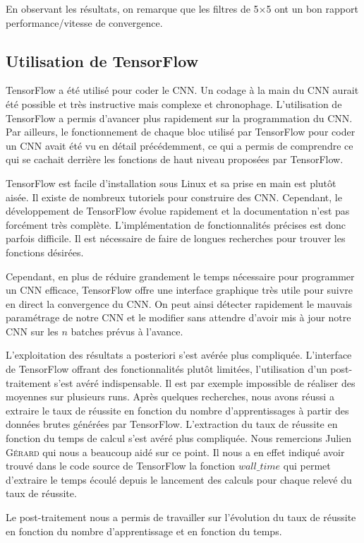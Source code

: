 En observant les résultats, on remarque que les filtres de 5$\times$5 ont un bon rapport performance/vitesse de convergence.


\subsection{Utilisation de TensorFlow}

TensorFlow a été utilisé pour coder le CNN. Un codage à la main du CNN aurait été possible et très instructive mais complexe et chronophage. L'utilisation de TensorFlow a permis d'avancer plus rapidement sur la programmation du CNN. Par ailleurs, le fonctionnement de chaque bloc utilisé par TensorFlow pour coder un CNN avait été vu en détail précédemment, ce qui a permis de comprendre ce qui se cachait derrière les fonctions de haut niveau proposées par TensorFlow.

TensorFlow est facile d'installation sous Linux et sa prise en main est plutôt aisée. Il existe de nombreux tutoriels pour construire des CNN. Cependant, le développement de TensorFlow évolue rapidement et la documentation n'est pas forcément très complète. L'implémentation de fonctionnalités précises est donc parfois difficile. Il est nécessaire de faire de longues recherches pour trouver les fonctions désirées.

Cependant, en plus de réduire grandement le temps nécessaire pour programmer un CNN efficace, TensorFlow offre une interface graphique très utile pour suivre en direct la convergence du CNN. On peut ainsi détecter rapidement le mauvais paramétrage de notre CNN et le modifier sans attendre d'avoir mis à jour notre CNN sur les $n$ batches prévus à l'avance.


L'exploitation des résultats a posteriori s'est avérée plus compliquée. L'interface de TensorFlow offrant des fonctionnalités plutôt limitées, l'utilisation d'un post-traitement s'est avéré indispensable. Il est par exemple impossible de réaliser des moyennes sur plusieurs runs. Après quelques recherches, nous avons réussi a extraire le taux de réussite en fonction du nombre d'apprentissages à partir des données brutes générées par TensorFlow. L'extraction du taux de réussite en fonction du temps de calcul s'est avéré plus compliquée. Nous remercions Julien \textsc{Gérard} qui nous a beaucoup aidé sur ce point. Il nous a en effet indiqué avoir trouvé dans le code source de TensorFlow la fonction $wall\_time$ qui permet d'extraire le temps écoulé depuis le lancement des calculs pour chaque relevé du taux de réussite.

Le post-traitement nous a permis de travailler sur l'évolution du taux de réussite en fonction du nombre d'apprentissage et en fonction du temps.

